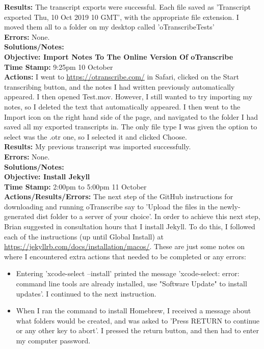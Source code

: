 \documentclass{article}
\begin{document}
\begin{FlushLeft}
\textbf{Results:} The transcript exports were successful. Each file saved as 'Transcript exported Thu, 10 Oct 2019 10 GMT', with the appropriate file extension. I moved them all to a folder on my desktop called 'oTranscribe\textunderscore Tests'\\
\textbf{Errors:} None.\\
\textbf{Solutions/Notes:}\\
\vspace{5mm}
\textbf{Objective: Import Notes To The Online Version Of oTranscribe}\\ 
\textbf{Time Stamp:} 9:25pm 10 October\\
\textbf{Actions:} I went to \url{https://otranscribe.com/} in Safari, clicked on the Start transcribing button, and the notes I had written previously automatically appeared. I then opened Test.mov. However, I still wanted to try importing my notes, so I deleted the text that automatically appeared. I then went to the Import icon on the right hand side of the page, and navigated to the folder I had saved all my exported transcripts in. The only file type I was given the option to select was the .otr one, so I selected it and clicked Choose.\\
\textbf{Results:} My previous transcript was imported successfully.\\
\textbf{Errors:} None.\\
\textbf{Solutions/Notes:}\\
\vspace{5mm}
\textbf{Objective: Install Jekyll}\\ 
\textbf{Time Stamp:} 2:00pm to 5:00pm 11 October\\
\textbf{Actions/Results/Errors:} The next step of the GitHub instructions for downloading and running oTranscribe say to 'Upload the files in the newly-generated dist folder to a server of your choice'. In order to achieve this next step, Brian suggested in consultation hours that I install Jekyll. To do this, I followed each of the instructions (up until Global Install) at \url{https://jekyllrb.com/docs/installation/macos/}. These are just some notes on where I encountered extra actions that needed to be completed or any errors:
\begin{itemize}
    \item Entering 'xcode-select --install' printed the message 'xcode-select: error: command line tools are already installed, use "Software Update" to install updates'. I continued to the next instruction.
    \item When I ran the command to install Homebrew, I received a message about what folders would be created, and was asked to 'Press RETURN to continue or any other key to abort'. I pressed the return button, and then had to enter my computer password.

\end{itemize}
\end{FlushLeft}
\end{document}
